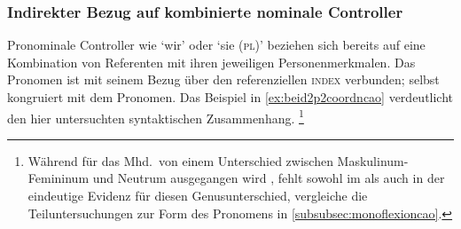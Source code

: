 \subsubsection{Indirekter Bezug auf kombinierte nominale Controller}
\label{subsubsec:beid2p2coordncao}

Pronominale Controller wie `wir' oder `sie (\textsc{pl})' beziehen sich
bereits auf eine Kombination von Referenten mit ihren jeweiligen
Personenmerkmalen. Das Pronomen ist mit seinem Bezug über den referenziellen
\textsc{index} verbunden;  selbst kongruiert mit dem Pronomen. Das
Beispiel in \cref{ex:beid2p2coordncao} verdeutlicht den hier untersuchten
syntaktischen Zusammenhang.%
%
	\footnote{Während für das  Mhd.\ von einem Unterschied
		zwischen Maskulinum-Femininum  und Neutrum 
		ausgegangen wird \autocites[vgl.][213--214]{paul2007}[369,
		390--397]{ksw2}, fehlt sowohl im \CAO{} als auch in der
		\KC{} eindeutige Evidenz für diesen Genusunterschied, vergleiche
		die Teiluntersuchungen zur Form des Pronomens in
		\cref{subsubsec:monoflexioncao}.}

